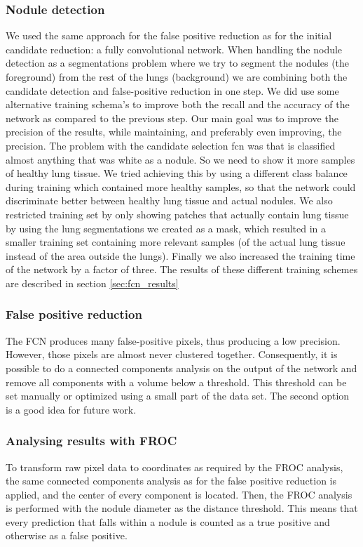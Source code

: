 \documentclass{article}
\begin{document}
	\subsubsection{Nodule detection}
	\label{sec:fcn}
	We used the same approach for the false positive reduction as for the initial candidate reduction: a fully convolutional network. When handling the nodule detection as a segmentations problem where we try to segment the nodules (the foreground) from the rest of the lungs (background) we are combining both the candidate detection and false-positive reduction in one step. We did use some alternative training schema's to improve both the recall and the accuracy of the network as compared to the previous step. Our main goal was to improve the precision of the results, while maintaining, and preferably even improving, the precision. The problem with the candidate selection fcn was that is classified almost anything that was white as a nodule. So we need to show it more samples of healthy lung tissue. We tried achieving this by using a different class balance during training which contained more healthy samples, so that the network could discriminate better between healthy lung tissue and actual nodules. We also restricted training set by only showing patches that actually contain lung tissue by using the lung segmentations we created as a mask, which resulted in a smaller training set containing more relevant samples (of the actual lung tissue instead of the area outside the lungs). Finally we also increased the training time of the network by a factor of three. The results of these different training schemes are described in section \ref{sec:fcn_results}
	
	
	
	\subsubsection{False positive reduction}
	The FCN produces many false-positive pixels, thus producing a low precision. However, those pixels are almost never clustered together. Consequently, it is possible to do a connected components analysis on the output of the network and remove all components with a volume below a threshold. This threshold can be set manually or optimized using a small part of the data set. The second option is a good idea for future work.
	
	\subsubsection{Analysing results with FROC}
	To transform raw pixel data to coordinates as required by the FROC analysis, the same connected components analysis as for the false positive reduction is applied, and the center of every component is located. Then, the FROC analysis is performed with the nodule diameter as the distance threshold. This means that every prediction that falls within a nodule is counted as a true positive and otherwise as a false positive.
	
\end{document}
